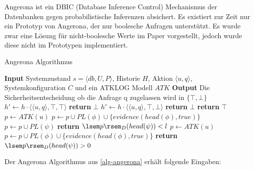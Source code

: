 \documentclass[german,version-2020-11]{uzl-thesis}
\begin{document}
Angerona ist ein DBIC (Database Inference Control) Mechanismus\cite{22} der Datenbanken gegen probabilistische Inferenzen absichert. Es existiert zur Zeit nur ein Prototyp von Angerona, der nur boolesche Anfragen unterstützt. Es wurde zwar eine Lösung für nicht-boolesche Werte im Paper vorgestellt, jedoch wurde diese nicht im Prototypen implementiert.
\begin{algorithm}
	\caption{Angerona Algorithmus}\label{alg-angerona}
	\begin{algorithmic}[1]
		\State \textbf{Input} Systemzustand $s=\langle db,U,P\rangle $, Historie $H$, Aktion $\langle u,q \rangle$, Systemkonfiguration $C$ und ein ATKLOG Modell $ATK$
		\State \textbf{Output} Die Sicherheitsentscheidung ob die Anfrage q zugelassen wird in $\{ \top, \bot \}$
		 \State 
		$h'\gets h \cdot \langle \langle u,q\rangle , \top , \top \rangle$
		\State \textbf{return} $\bot$
		\EndIf
		\EndIf
		 \State 
		$h'\gets h \cdot \langle \langle u, q\rangle , \top , \bot \rangle$
		\State \textbf{return} $\bot$
		\EndIf
		\EndIf
		\EndIf
		\EndFor
		\State \textbf{return} $\top$
		\State
		\State $p\gets ATK(u)$
		\State $p\gets p \cup PL(\phi) \cup \{evidence(head(\phi),true)\}$ 
		\EndFor
		\State $p\gets p\cup PL(\psi)$
		\State \textbf{return} $\lsem p \rsem_D   (head(\psi)) < l $
		\EndFunction
		\State
		\State $p\gets ATK(u)$
		\State $p\gets p \cup PL(\phi) \cup \{evidence(head(\phi),true)\}$ 
		\EndFor
		\State \textbf{return} $\lsem p \rsem_D   (head(\psi)) > 0 $
		\EndFunction
	\end{algorithmic}
\end{algorithm}
Der Angerona Algorithmus aus \autoref{alg-angerona} erhält folgende Eingaben:
\end{document}
